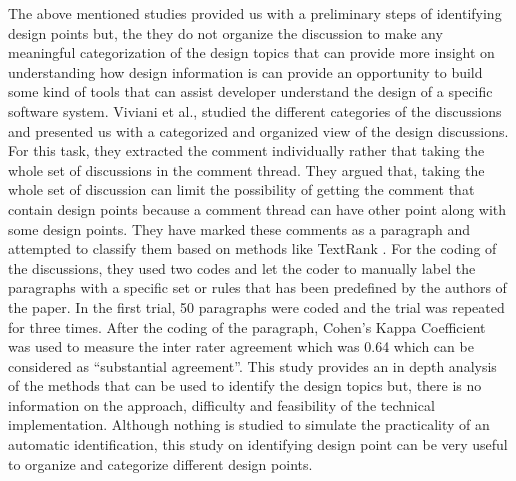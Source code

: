 The above mentioned studies provided us with a preliminary steps of identifying design points but, the they do not organize the discussion to make any meaningful categorization of the design topics that can provide more insight on understanding how design information is can provide an opportunity to build some kind of tools that can assist developer understand the design of a specific software system. Viviani et al.,\cite{Viviani2018} studied the different categories of the discussions and presented us with a categorized and organized view of the design discussions. For this task, they extracted the comment individually rather that taking the whole set of discussions in the comment thread. They argued that, taking the whole set of discussion can limit the possibility of getting the comment that contain design points because a comment thread can have other point along with some design points. They have marked these comments as a paragraph and attempted to classify them based on methods like TextRank \cite{Mihalcea2004}. For the coding of the discussions, they used two codes and let the coder to manually label the paragraphs with a specific set or rules that has been predefined by the authors of the paper. In the first trial, 50 paragraphs were coded and the trial was repeated for three times. After the coding of the paragraph, Cohen’s Kappa Coefficient was used to measure the inter rater agreement which was 0.64 which can be considered as ``substantial agreement''. This study provides an in depth analysis of the methods that can be used to identify the design topics but, there is no information on the approach, difficulty and feasibility of the technical implementation. Although nothing is studied to simulate the practicality of an automatic identification, this study on identifying design point can be very useful to organize and categorize different design points.           